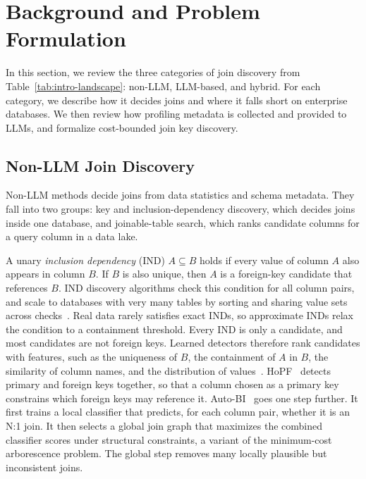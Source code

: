 \section{Background and Problem Formulation}
\label{sec:background}
In this section, we review the three categories of join discovery from Table~\ref{tab:intro-landscape}: non-LLM, LLM-based, and hybrid.
For each category, we describe how it decides joins and where it falls short on enterprise databases.
We then review how profiling metadata is collected and provided to LLMs, and formalize cost-bounded join key discovery.

\subsection{Non-LLM Join Discovery}
\label{sec:bg_nonllm}
Non-LLM methods decide joins from data statistics and schema metadata.
They fall into two groups: key and inclusion-dependency discovery, which decides joins inside one database, and joinable-table search, which ranks candidate columns for a query column in a data lake.

 A unary \emph{inclusion dependency} (IND) $A \subseteq B$ holds if every value of column $A$ also appears in column $B$.
If $B$ is also unique, then $A$ is a foreign-key candidate that references $B$.
IND discovery algorithms check this condition for all column pairs, and scale to databases with very many tables by sorting and sharing value sets across checks~\cite{Tschirschnitz17}.
Real data rarely satisfies exact INDs, so approximate INDs relax the condition to a containment threshold.
Every IND is only a candidate, and most candidates are not foreign keys.
Learned detectors therefore rank candidates with features, such as the uniqueness of $B$, the containment of $A$ in $B$, the similarity of column names, and the distribution of values~\cite{Rostin09,ZhangHOPS10}.
HoPF~\cite{HoPF} detects primary and foreign keys together, so that a column chosen as a primary key constrains which foreign keys may reference it.
Auto-BI~\cite{AutoBI} goes one step further.
It first trains a local classifier that predicts, for each column pair, whether it is an N:1 join.
It then selects a global join graph that maximizes the combined classifier scores under structural constraints, a variant of the minimum-cost arborescence problem.
The global step removes many locally plausible but inconsistent joins.


